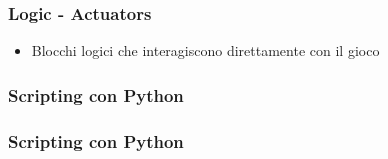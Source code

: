 \documentclass{beamer}
\begin{document}
		
		\begin{frame}
			\frametitle{Logic - Actuators} %
			\begin{itemize}
				\item Blocchi logici che interagiscono direttamente con il gioco
			\end{itemize}
		\end{frame}			
		
		\begin{frame}
			\frametitle{Scripting con Python}
		\end{frame}	
		
		\begin{frame}
			\frametitle{Scripting con Python}
		\end{frame}	
\end{document}
